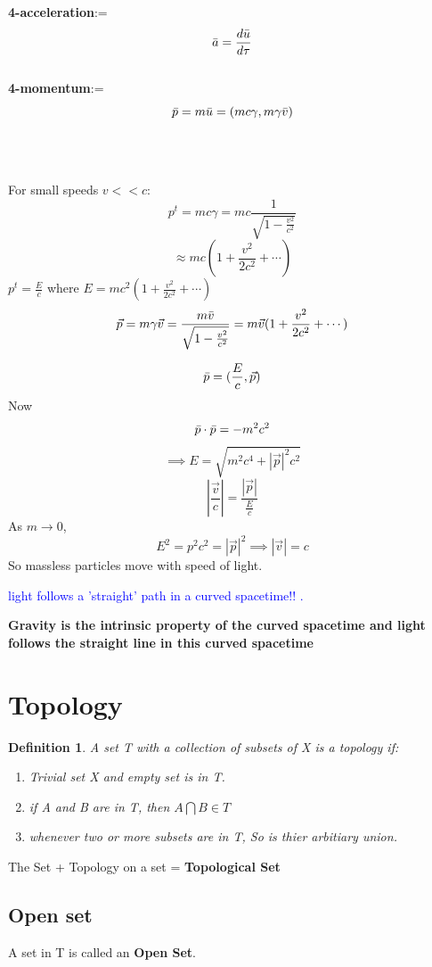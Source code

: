 \documentclass{article}
\newtheorem{defn}{Definition}[section]
\newcommand\note[1]{\textcolor{blue}{#1}}
\begin{document}
\vspace{4mm}
\textbf{4-acceleration}:=$$\Bar{a}= \frac{d\Bar{u}}{d\tau}$$\\
\textbf{4-momentum}:= $$\Bar{p}=m\Bar{u}=(mc\gamma,m\gamma\Bar{v})$$\\ \\
\hspace{4mm}
\\

For small speeds $v<<c$:
$$p^t= mc\gamma= mc\frac{1}{\sqrt{1-\frac{v^2}{c^2}}}$$
$$\approx mc(1+\frac{v^2}{2c^2} + \cdots )$$
$p^t= \frac{E}{c} $ where $E = mc^2(1+\frac{v^2}{2c^2} + \cdots )$
$$\Vec{p}= m\gamma\Vec{v}= \frac{m\Bar{v}}{\sqrt{1-\frac{v^2}{c^2}}}=m\Vec{v}(1+\frac{v^2}{2c^2}+\cdots)$$

$$\Bar{p}=(\frac{E}{c},\Vec{p})$$
Now $$\Bar{p}\cdot \Bar{p}= -m^2c^2$$
$$\implies E = \sqrt{m^2c^4 + |\vec{p}|^2c^2}$$
$$|\frac{\vec{v}}{c}|= \frac{|\vec{p}|}{\frac{E}{c}}$$
As $m\xrightarrow{}0$, $$E^2 = p^2c^2= |\vec{p}|^2\implies |\vec{v}|=c$$
So massless particles move with speed of light.

\note{light follows a 'straight' path in a curved spacetime!! .\\ }

\textbf{Gravity is the \textbf{intrinsic} property of the curved spacetime and light follows the straight line  
in this curved spacetime} 

\section{Topology }

\begin{defn}
    A set T with a collection of subsets of X is a topology if:
    \begin{enumerate}
        \item Trivial set X and empty set is in T.
        \item if A and B are in T, then $A\bigcap B \in T$
        \item whenever two or more subsets are in T, So is thier arbitiary union.
        \ 
    \end{enumerate}
\end{defn}
The Set + Topology on a set = \textbf{Topological Set} 
\subsection{Open set}
A set in T is called an \textbf{Open Set}.
\end{document}
